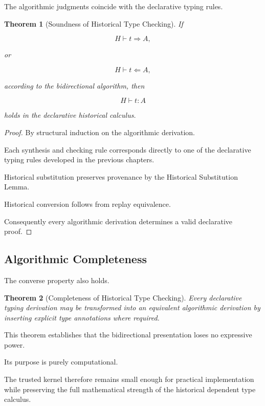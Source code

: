 \documentclass[12pt,oneside]{article}
\newtheorem{theorem}{Theorem}[section]
\theoremstyle{definition}
\theoremstyle{remark}
\begin{document}
The algorithmic judgments coincide with the declarative typing rules.

\begin{theorem}[Soundness of Historical Type Checking]

If

\[
H
\vdash
t
\Rightarrow
A,
\]

or

\[
H
\vdash
t
\Leftarrow
A,
\]

according to the bidirectional algorithm, then

\[
H
\vdash
t:A
\]

holds in the declarative historical calculus.

\end{theorem}

\begin{proof}

By structural induction on the algorithmic derivation.

Each synthesis and checking rule corresponds directly to one of the declarative
typing rules developed in the previous chapters.

Historical substitution preserves provenance by the Historical Substitution
Lemma.

Historical conversion follows from replay equivalence.

Consequently every algorithmic derivation determines a valid declarative proof.

\end{proof}

\subsection{Algorithmic Completeness}

The converse property also holds.

\begin{theorem}[Completeness of Historical Type Checking]

Every declarative typing derivation may be transformed into an equivalent
algorithmic derivation by inserting explicit type annotations where required.

\end{theorem}

This theorem establishes that the bidirectional presentation loses no expressive
power.

Its purpose is purely computational.

The trusted kernel therefore remains small enough for practical implementation
while preserving the full mathematical strength of the historical dependent
type calculus.
\end{document}

